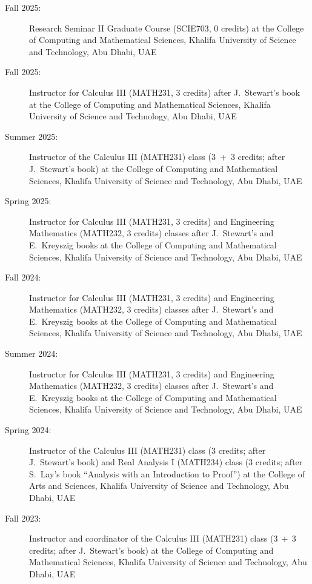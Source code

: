 \documentclass[final, a4paper, oneside, 12pt]{article}
\numberwithin{equation}{section}
\begin{document}
\begin{description}

  \item[Fall 2025:] Research Seminar II Graduate Course (SCIE703, $0$ credits) at the College of Computing and Mathematical Sciences, Khalifa University of Science and Technology, Abu Dhabi, UAE

  \item[Fall 2025:] Instructor for Calculus III (MATH231, $3$ credits) after J.~Stewart's book at the College of Computing and Mathematical Sciences, Khalifa University of Science and Technology, Abu Dhabi, UAE

  \item[Summer 2025:] Instructor of the Calculus III (MATH231) class ($3$\ +\ $3$ credits; after J.~Stewart's book) at the College of Computing and Mathematical Sciences, Khalifa University of Science and Technology, Abu Dhabi, UAE

  \item[Spring 2025:] Instructor for Calculus III (MATH231, $3$ credits) and Engineering Mathematics (MATH232, $3$ credits) classes after J.~Stewart's and E.~Kreyszig books at the College of Computing and Mathematical Sciences, Khalifa University of Science and Technology, Abu Dhabi, UAE

  \item[Fall 2024:] Instructor for Calculus III (MATH231, $3$ credits) and Engineering Mathematics (MATH232, $3$ credits) classes after J.~Stewart's and E.~Kreyszig books at the College of Computing and Mathematical Sciences, Khalifa University of Science and Technology, Abu Dhabi, UAE

  \item[Summer 2024:] Instructor for Calculus III (MATH231, $3$ credits) and Engineering Mathematics (MATH232, $3$ credits) classes after J.~Stewart's and E.~Kreyszig books at the College of Computing and Mathematical Sciences, Khalifa University of Science and Technology, Abu Dhabi, UAE

  \item[Spring 2024:] Instructor of the Calculus III (MATH231) class ($3$ credits; after J.~Stewart's book) and Real Analysis I (MATH234) class ($3$ credits; after S.~Lay's book ``Analysis with an Introduction to Proof'') at the College of Arts and Sciences, Khalifa University of Science and Technology, Abu Dhabi, UAE

  \item[Fall 2023:] Instructor and coordinator of the Calculus III (MATH231) class ($3\ +\ 3$ credits; after J.~Stewart's book) at the College of Computing and Mathematical Sciences, Khalifa University of Science and Technology, Abu Dhabi, UAE


\end{description}
\end{document}
